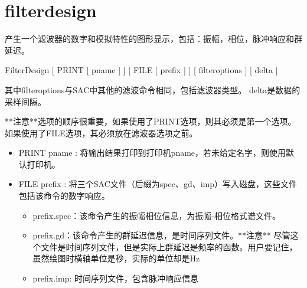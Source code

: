 \section{filterdesign}
\label{cmd:filterdesign}

产生一个滤波器的数字和模拟特性的图形显示，包括：振幅，相位，脉冲响应和群延迟。

FilterDesign [ PRINT [ pname ] ] [ FILE [ prefix ] ] [ filteroptions ] [ delta ]

其中filteroptions与SAC中其他的滤波命令相同，包括滤波器类型。
delta是数据的采样间隔。

**注意**选项的顺序很重要，如果使用了PRINT选项，则其必须是第一个选项。如果使用了FILE选项，其必须放在滤波器选项之前。

\begin{itemize}
\item PRINT pname : 将输出结果打印到打印机pname，若未给定名字，则使用默认打印机。
\item FILE prefix : 将三个SAC文件（后缀为spec、gd、imp）写入磁盘，这些文件包括该命令的数字响应。 
	\begin{itemize}
	\item prefix.spec：该命令产生的振幅相位信息，为振幅-相位格式谱文件。
	\item prefix.gd：该命令产生的群延迟信息，是时间序列文件。**注意** 尽管这个文件是时间序列文件，但是实际上群延迟是频率的函数。用户要记住，虽然绘图时横轴单位是秒，实际的单位却是Hz
	\item prefix.imp: 时间序列文件，包含脉冲响应信息
	\end{itemize}
\end{itemize}

